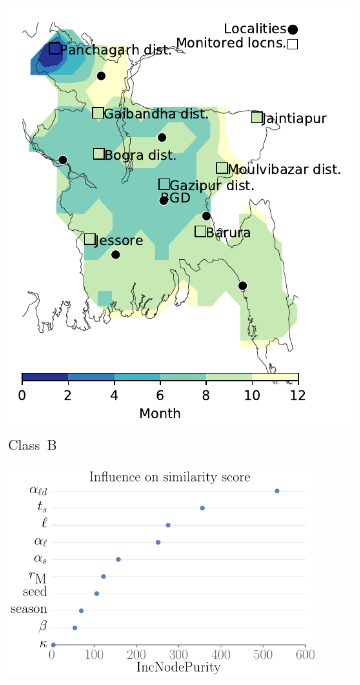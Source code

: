 \documentclass[11pt]{article}
\newcommand{\ald}{\alpha_{\ell d}}
\theoremstyle{definition}
\begin{document}
\begin{figure}[t]
\begin{subfigure}[b]{.3\textwidth}
    \includegraphics[width=\textwidth]{../../cellular_automata/results/contour/BGD_model-B_m1_l3.pdf}
    \caption{Class~B \label{fig:bgdClassB1}} %
\end{subfigure}
\begin{subfigure}[b]{.32\textwidth}
    \centering
    \includegraphics[width=0.9\textwidth]{../../cellular_automata/results/rf/rf_importance_all_mdi.pdf}

\end{subfigure}
\end{figure}
\end{document}
